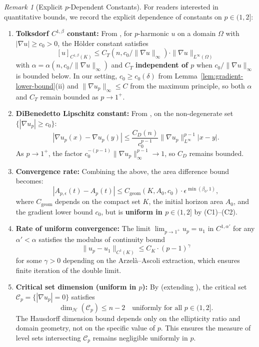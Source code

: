 \documentclass[12pt]{article}
\theoremstyle{plain}
\theoremstyle{definition}
\theoremstyle{remark}
\newtheorem{remark}[theorem]{Remark}
\begin{document}
\begin{remark}[Explicit $p$-Dependent Constants]\label{rem:p-constants}
For readers interested in quantitative bounds, we record the explicit dependence of constants on $p \in (1, 2]$:
\begin{enumerate}
    \item[(C1)] \textbf{Tolksdorf $C^{1,\beta}$ constant:} From \cite[Theorem 1.1]{tolksdorf1984}, for $p$-harmonic $u$ on a domain $\Omega$ with $|\nabla u| \geq c_0 > 0$, the H\"older constant satisfies
    \[
    [u]_{C^{1,\beta}(K)} \leq C_T(n, c_0/\|\nabla u\|_\infty) \cdot \|\nabla u\|_{L^\infty(\Omega)}
    \]
    with $\alpha = \alpha(n, c_0/\|\nabla u\|_\infty)$ and $C_T$ \textbf{independent of $p$} when $c_0/\|\nabla u\|_\infty$ is bounded below. In our setting, $c_0 \geq c_0(\delta)$ from Lemma~\ref{lem:gradient-lower-bound}(ii) and $\|\nabla u_p\|_\infty \leq C$ from the maximum principle, so both $\alpha$ and $C_T$ remain bounded as $p \to 1^+$.
    
    \item[(C2)] \textbf{DiBenedetto Lipschitz constant:} From \cite[Chapter VIII, Theorem 1.1]{dibenedetto1993}, on the non-degenerate set $\{|\nabla u_p| \geq c_0\}$:
    \[
    |\nabla u_p(x) - \nabla u_p(y)| \leq \frac{C_D(n)}{c_0^{p-1}} \|\nabla u_p\|_{L^\infty}^{p-1} |x - y|.
    \]
    As $p \to 1^+$, the factor $c_0^{-(p-1)} \|\nabla u_p\|_\infty^{p-1} \to 1$, so $C_D$ remains bounded.
    
    \item[(C3)] \textbf{Convergence rate:} Combining the above, the area difference bound becomes:
    \[
    |A_{p,\epsilon}(t) - A_p(t)| \leq C_{\mathrm{geom}}(K, A_0, c_0) \cdot \epsilon^{\min(\beta_0, 1)},
    \]
    where $C_{\mathrm{geom}}$ depends on the compact set $K$, the initial horizon area $A_0$, and the gradient lower bound $c_0$, but is \textbf{uniform in $p \in (1, 2]$} by (C1)--(C2).
    
    \item[(C4)] \textbf{Rate of uniform convergence:} The limit $\lim_{p \to 1^+} u_p = u_1$ in $C^{1,\alpha'}$ for any $\alpha' < \alpha$ satisfies the modulus of continuity bound
    \[
    \|u_p - u_1\|_{C^1(K)} \leq C_K \cdot (p - 1)^{\gamma}
    \]
    for some $\gamma > 0$ depending on the Arzel\`a--Ascoli extraction, which ensures finite iteration of the double limit.
    
    \item[(C5)] \textbf{Critical set dimension (uniform in $p$):} By \cite[Theorem 1.2]{naber_valtorta2017} (extending \cite{hardt_simon1989}), the critical set $\mathcal{C}_p = \{|\nabla u_p| = 0\}$ satisfies
    \[
    \dim_{\mathcal{H}}(\mathcal{C}_p) \leq n - 2 \quad \text{uniformly for all } p \in (1, 2].
    \]
    The Hausdorff dimension bound depends only on the ellipticity ratio and domain geometry, not on the specific value of $p$. This ensures the measure of level sets intersecting $\mathcal{C}_p$ remains negligible uniformly in $p$.
    

\end{enumerate}
\end{remark}
\end{document}
